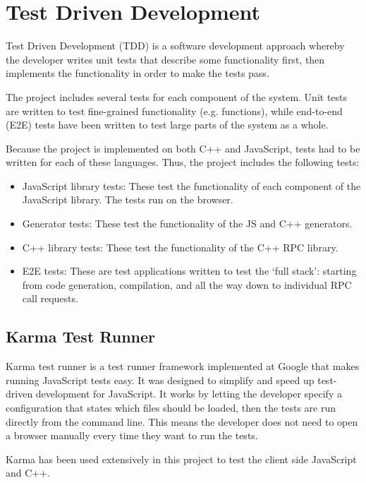 \section{Test Driven Development} %
\label{sec:test_driven_development}
Test Driven Development (TDD) is a software development approach whereby the developer writes unit tests that describe some functionality first, then implements the functionality in order to make the tests pass.

The project includes several tests for each component of the system. Unit tests are written to test fine-grained functionality (e.g. functions), while end-to-end (E2E) tests have been written to test large parts of the system as a whole.

Because the project is implemented on both C++ and JavaScript, tests had to be written for each of these languages. Thus, the project includes the following tests:

\begin{itemize}
	\item JavaScript library tests: These test the functionality of each component of the JavaScript library. The tests run on the browser.
	\item Generator tests: These test the functionality of the JS and C++ generators.
	\item C++ library tests: These test the functionality of the C++ RPC library.
	\item E2E tests: These are test applications written to test the `full stack': starting from code generation, compilation, and all the way down to individual RPC call requests.
\end{itemize}

\subsection{Karma Test Runner} %
\label{sub:karma_test_runner}
Karma test runner \cite{karmarunner} is a test runner framework implemented at Google that makes running JavaScript tests easy. It was designed to simplify and speed up test-driven development for JavaScript. It works by letting the developer specify a configuration that states which files should be loaded, then the tests are run directly from the command line. This means the developer does not need to open a browser manually every time they want to run the tests.

Karma has been used extensively in this project to test the client side JavaScript and C++.

